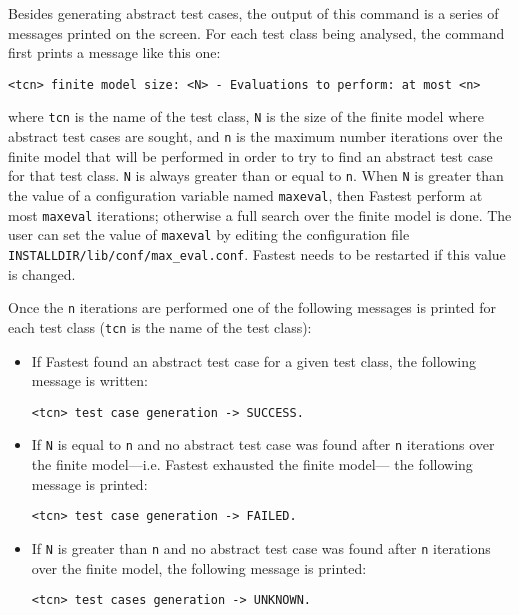 Besides generating abstract test cases, the output of this command is a series of messages printed on the screen. For each test class being analysed, the command first prints a message like this one:

\begin{verbatim}
<tcn> finite model size: <N> - Evaluations to perform: at most <n>
\end{verbatim}

\noindent where \verb+tcn+ is the name of the test class, \verb+N+ is the size of the finite model where abstract test cases are sought, and \verb+n+ is the maximum number iterations over the finite model that will be performed in order to try to find an abstract test case for that test class. \verb+N+ is always greater than or equal to \verb+n+. When \verb+N+ is greater than the value of a configuration variable named \verb+maxeval+, then Fastest perform at most \verb+maxeval+ iterations; otherwise a full search over the finite model is done. The user can set the value of \verb+maxeval+ by editing the configuration file \verb+INSTALLDIR/lib/conf/max_eval.conf+. Fastest needs to be restarted if this value is changed.

Once the \verb+n+ iterations are performed one of the following messages is printed for each test class (\verb+tcn+ is the name of the test class):

\begin{itemize}
\item If Fastest found an abstract test case for a given test class, the following message is written:

\begin{verbatim}
<tcn> test case generation -> SUCCESS.
\end{verbatim}

\item If \verb+N+ is equal to \verb+n+ and no abstract test case was found after \verb+n+ iterations over the finite model---i.e. Fastest exhausted the finite model--- the following message is printed:

\begin{verbatim}
<tcn> test case generation -> FAILED.
\end{verbatim}

\item If \verb+N+ is greater than \verb+n+ and no abstract test case was found after \verb+n+ iterations over the finite model, the following message is printed:

\begin{verbatim}
<tcn> test cases generation -> UNKNOWN.
\end{verbatim}
\end{itemize}

